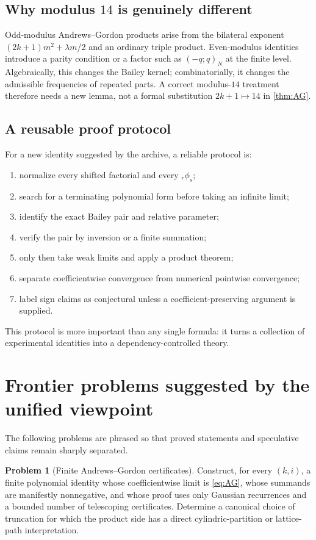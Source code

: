 \documentclass[11pt]{article}
\numberwithin{equation}{section}
\theoremstyle{definition}
\newtheorem{problem}[theorem]{Problem}
\theoremstyle{remark}
\begin{document}
\subsection{Why modulus $14$ is genuinely different}
Odd-modulus Andrews--Gordon products arise from the bilateral exponent
\((2k+1)m^2+\lambda m\)/2 and an ordinary triple product.  Even-modulus
identities introduce a parity condition or a factor such as
$(-q;q)_N$ at the finite level.  Algebraically, this changes the Bailey
kernel; combinatorially, it changes the admissible frequencies of repeated
parts.  A correct modulus-$14$ treatment therefore needs a new lemma, not a
formal substitution $2k+1\mapsto14$ in \cref{thm:AG}.

\subsection{A reusable proof protocol}
For a new identity suggested by the archive, a reliable protocol is:
\begin{enumerate}[label=\arabic*.]
\item normalize every shifted factorial and every ${}_r\phi_s$;
\item search for a terminating polynomial form before taking an infinite
limit;
\item identify the exact Bailey pair and relative parameter;
\item verify the pair by inversion or a finite summation;
\item only then take weak limits and apply a product theorem;
\item separate coefficientwise convergence from numerical pointwise
convergence;
\item label sign claims as conjectural unless a coefficient-preserving
argument is supplied.
\end{enumerate}
This protocol is more important than any single formula: it turns a collection
of experimental identities into a dependency-controlled theory.

\section{Frontier problems suggested by the unified viewpoint}

The following problems are phrased so that proved statements and speculative
claims remain sharply separated.

\begin{problem}[Finite Andrews--Gordon certificates]\label{prob:finiteAG}
Construct, for every $(k,i)$, a finite polynomial identity whose
coefficientwise limit is \eqref{eq:AG}, whose summands are manifestly
nonnegative, and whose proof uses only Gaussian recurrences and a bounded
number of telescoping certificates.  Determine a canonical choice of
truncation for which the product side has a direct cylindric-partition or
lattice-path interpretation.
\end{problem}
\end{document}
